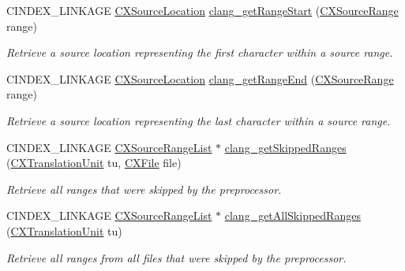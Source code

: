 \begin{DoxyCompactItemize}
\mbox{\label{group__CINDEX__LOCATIONS_gac2cc034e3965739c41662f6ada7ff248}} 
C\+I\+N\+D\+E\+X\+\_\+\+L\+I\+N\+K\+A\+GE \hyperlink{structCXSourceLocation}{C\+X\+Source\+Location} \hyperlink{group__CINDEX__LOCATIONS_gac2cc034e3965739c41662f6ada7ff248}{clang\+\_\+get\+Range\+Start} (\hyperlink{structCXSourceRange}{C\+X\+Source\+Range} range)
\begin{DoxyCompactList}\small\item\em Retrieve a source location representing the first character within a source range. \end{DoxyCompactList}\item 
\mbox{\label{group__CINDEX__LOCATIONS_gacdb7d3c2b77a06bcc2e83bde3e14c3c0}} 
C\+I\+N\+D\+E\+X\+\_\+\+L\+I\+N\+K\+A\+GE \hyperlink{structCXSourceLocation}{C\+X\+Source\+Location} \hyperlink{group__CINDEX__LOCATIONS_gacdb7d3c2b77a06bcc2e83bde3e14c3c0}{clang\+\_\+get\+Range\+End} (\hyperlink{structCXSourceRange}{C\+X\+Source\+Range} range)
\begin{DoxyCompactList}\small\item\em Retrieve a source location representing the last character within a source range. \end{DoxyCompactList}\item 
C\+I\+N\+D\+E\+X\+\_\+\+L\+I\+N\+K\+A\+GE \hyperlink{structCXSourceRangeList}{C\+X\+Source\+Range\+List} $\ast$ \hyperlink{group__CINDEX__LOCATIONS_gae27bc89151459aeb94e0fb7aa0552d35}{clang\+\_\+get\+Skipped\+Ranges} (\hyperlink{group__CINDEX_gacdb7815736ca709ce9a5e1ec2b7e16ac}{C\+X\+Translation\+Unit} tu, \hyperlink{group__CINDEX__FILES_gacfcea9c1239c916597e2e5b3e109215a}{C\+X\+File} file)
\begin{DoxyCompactList}\small\item\em Retrieve all ranges that were skipped by the preprocessor. \end{DoxyCompactList}\item 
C\+I\+N\+D\+E\+X\+\_\+\+L\+I\+N\+K\+A\+GE \hyperlink{structCXSourceRangeList}{C\+X\+Source\+Range\+List} $\ast$ \hyperlink{group__CINDEX__LOCATIONS_ga06a114b020fda470476ff5293a66e5e1}{clang\+\_\+get\+All\+Skipped\+Ranges} (\hyperlink{group__CINDEX_gacdb7815736ca709ce9a5e1ec2b7e16ac}{C\+X\+Translation\+Unit} tu)
\begin{DoxyCompactList}\small\item\em Retrieve all ranges from all files that were skipped by the preprocessor. \end{DoxyCompactList}\item 

\end{DoxyCompactItemize}
